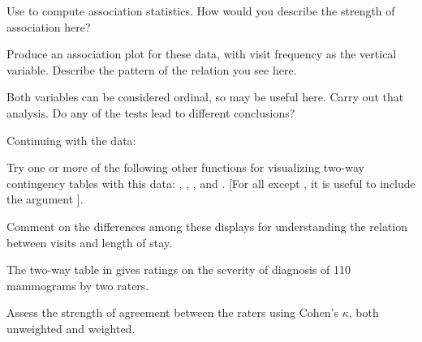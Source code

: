 \documentclass[10pt]{report}\usepackage[]{graphicx}\usepackage[]{color}
\begin{document}
\begin{Exercises}
\begin{enumerate*}
      \item Use  to compute association statistics.
      How would you describe the strength of association here?
      \begin{ans}
      \end{ans}
      
      \item Produce an association plot for these data, with
      visit frequency as the vertical variable.  Describe the
      pattern of the relation you see here.
      \begin{ans}
      \end{ans}
      
      \item Both variables can be considered ordinal, so
       may be useful here.  Carry out that
      analysis.  Do any of the tests lead to different conclusions?
      \begin{ans}
      \end{ans}
      
    \end{enumerate*}

  \exercise Continuing with the  data:
    \begin{enumerate*}
      \item Try one or more of the following other functions for visualizing two-way contingency tables with this data: 
      , , , and .  
      [For all except , it is useful to include the argument ].
      \begin{ans}
      \end{ans}
      
      \item Comment on the differences among these displays for understanding the relation between 
      visits and length of stay.
      \begin{ans}
      \end{ans}
      
    \end{enumerate*}
  
  \exercise The two-way table  in  gives ratings
  on the severity of diagnosis of 110 mammograms by two raters.
    \begin{enumerate*}
      \item Assess the strength of agreement between the raters using Cohen's
      $\kappa$, both unweighted and weighted.
      \begin{ans}
      \end{ans}
      

\end{enumerate*}
\end{Exercises}
\end{document}
